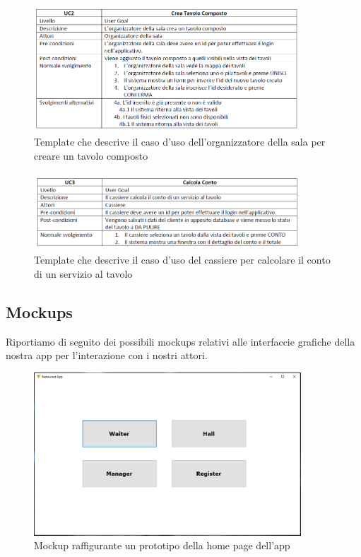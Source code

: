 \documentclass{article}
\begin{document}
\begin{figure}[!h]
\centering
\includegraphics[width= 10cm]{"Immagini/CreateComposedTable.PNG"}
\caption{Template che descrive il caso d'uso dell'organizzatore della sala per creare un tavolo composto}
\end{figure}

\newpage

\begin{figure}[!h]
\centering
\includegraphics[width= 10cm]{"Immagini/GetBill.PNG"}
\caption{Template che descrive il caso d'uso del cassiere per calcolare il conto di un servizio al tavolo}
\end{figure}

\subsection{Mockups}
Riportiamo di seguito dei possibili mockups relativi alle interfaccie grafiche della nostra app per l'interazione con i nostri attori.

\begin{figure}[!h]
\centering
\includegraphics[width= 10cm]{"Immagini/HomePage.PNG"}
\caption{Mockup raffigurante un prototipo della home page dell'app}
\end{figure}
\end{document}
